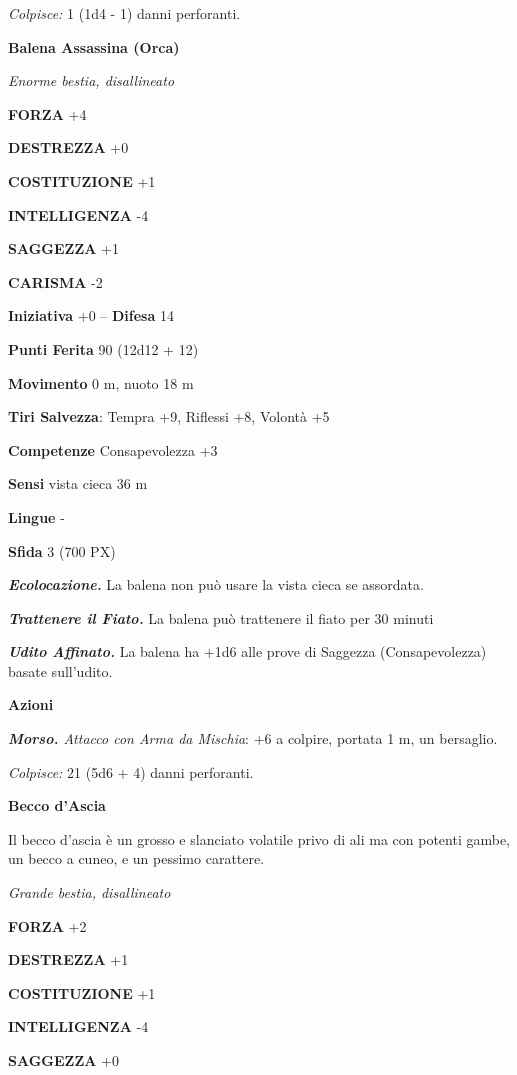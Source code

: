 \begin{multicols}{2}
	\textit{Colpisce:} 1 (1d4 - 1) danni perforanti.


	\medskip\textbf{Balena Assassina (Orca)}

	\textit{Enorme bestia, disallineato}

	\textbf{FORZA} +4

	\textbf{DESTREZZA} +0

	\textbf{COSTITUZIONE} +1

	\textbf{INTELLIGENZA} -4

	\textbf{SAGGEZZA} +1

	\textbf{CARISMA} -2

	\textbf{Iniziativa} +0 -- \textbf{Difesa} 14

	\textbf{Punti Ferita} 90 (12d12 + 12)

	\textbf{Movimento} 0 m, nuoto 18 m

	\textbf{Tiri Salvezza}: Tempra +9, Riflessi +8, Volontà +5

	\textbf{Competenze} Consapevolezza +3

	\textbf{Sensi} vista cieca 36 m

	\textbf{Lingue} -

	\textbf{Sfida} 3 (700 PX)

	\textit{\textbf{Ecolocazione.}} La balena non può usare la vista cieca se assordata.

	\textit{\textbf{Trattenere il Fiato.}} La balena può trattenere il fiato per 30 minuti

	\textit{\textbf{Udito Affinato.}} La balena ha +1d6 alle prove di Saggezza (Consapevolezza) basate sull'udito.

	\textbf{Azioni}

	\textit{\textbf{Morso.} Attacco con Arma da Mischia}: +6 a colpire, portata 1 m, un bersaglio.

	\textit{Colpisce:} 21 (5d6 + 4) danni perforanti.

	\medskip\textbf{Becco d'Ascia}

	Il becco d'ascia è un grosso e slanciato volatile privo di ali ma con potenti gambe, un becco a cuneo, e un pessimo carattere.

	\textit{Grande bestia, disallineato}

	\textbf{FORZA} +2

	\textbf{DESTREZZA} +1

	\textbf{COSTITUZIONE} +1

	\textbf{INTELLIGENZA} -4

	\textbf{SAGGEZZA} +0


\end{multicols}
